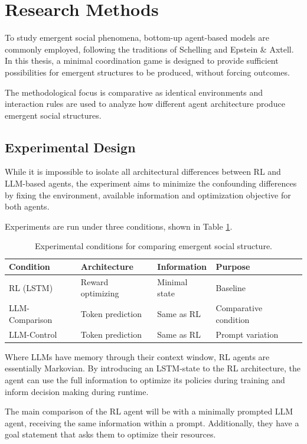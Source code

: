 \section{Research Methods}
To study emergent social phenomena, bottom-up agent-based models are commonly employed, following the traditions of Schelling and Epstein \& Axtell. In this thesis, a minimal coordination game is designed to provide sufficient possibilities for emergent structures to be produced, without forcing outcomes.

The methodological focus is comparative as identical environments and interaction rules are used to analyze how different agent architecture produce emergent social structures.

\subsection{Experimental Design}
While it is impossible to isolate all architectural differences between RL and LLM-based agents, the experiment aims to minimize the confounding differences by fixing the environment, available information and optimization objective for both agents.

Experiments are run under three conditions, shown in Table \ref{tab:conditions}.

\begin{table}[h]
\centering
\begin{tabular}{@{}llll@{}}
\toprule
\textbf{Condition} & \textbf{Architecture} & \textbf{Information} & \textbf{Purpose} \\
\midrule
RL (LSTM) & Reward optimizing & Minimal state & Baseline \\
LLM-Comparison & Token prediction & Same as RL & Comparative condition \\
LLM-Control & Token prediction & Same as RL & Prompt variation \\
\bottomrule
\end{tabular}
\caption{Experimental conditions for comparing emergent social structure.}
\label{tab:conditions}
\end{table}

Where LLMs have memory through their context window, RL agents are essentially Markovian. By introducing an LSTM-state to the RL architecture, the agent can use the full information to optimize its policies during training and inform decision making during runtime.

The main comparison of the RL agent will be with a minimally prompted LLM agent, receiving the same information within a prompt. Additionally, they have a goal statement that asks them to optimize their resources.


